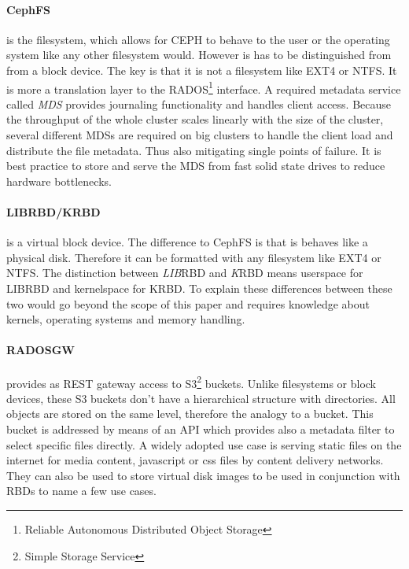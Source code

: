 \documentclass[titlepage, a4paper, 11pt]{scrartcl}
\begin{document}
                \paragraph{CephFS} is the filesystem, which allows for CEPH to behave to the user or the operating system like any other
                filesystem would. However is has to be distinguished from from a block device. 
                The key is that it is not a filesystem like EXT4 or NTFS. It is more a translation layer to the
                RADOS\footnote{Reliable Autonomous Distributed Object Storage} interface. A required metadata service called \textit{MDS} provides journaling functionality and handles client access. Because the throughput of the whole cluster scales linearly with the size of the cluster,
                several different MDSs are required on big clusters to handle the client load and distribute the file metadata. Thus also mitigating
                single points of failure. It is best practice to store and serve the MDS from fast solid state drives to reduce hardware bottlenecks.

                \paragraph{LIBRBD/KRBD} is a virtual block device. The difference to CephFS is that is behaves like a physical disk.
                Therefore it can be formatted with any filesystem like EXT4 or NTFS. The distinction between \textit{LIB}RBD and \textit{K}RBD
                means userspace for LIBRBD and kernelspace for KRBD. To explain these differences between these two would go beyond the 
                scope of this paper and requires knowledge about kernels, operating systems and memory handling. 

                \paragraph{RADOSGW} provides as REST gateway access to S3\footnote{Simple Storage Service} buckets. Unlike filesystems or block devices, these S3
                buckets don't have a hierarchical structure with directories. All objects are stored on the same level, therefore the 
                analogy to a bucket. This bucket is addressed by means of an API which provides also a metadata filter to select
                specific files directly.
                A widely adopted use case is serving static files on the internet for media content, javascript or css files by content delivery networks.
                They can also be used to store virtual disk images to be used in conjunction with RBDs to name a few use cases.
\end{document}
